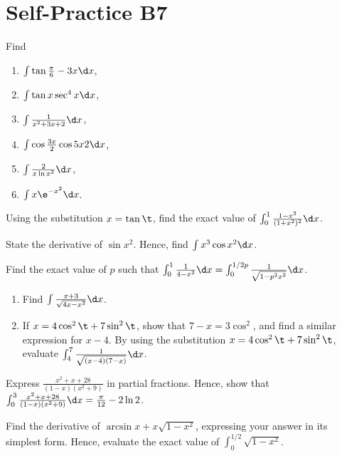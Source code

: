 \section{Self-Practice B7}

\begin{problem}
    Find
    \begin{enumerate}
        \item $\int \tan{\frac\pi6 - 3x} \d x$,
        \item $\int \tan x \sec^4 x \d x$,
        \item $\int \frac1{x^2 + 3x + 2} \d x$,
        \item $\int \cos \frac{3x}{2} \cos{5x}{2} \d x$,
        \item $\int \frac2{x \ln x^2} \d x$,
        \item $\int x \e^{-x^2} \d x$.
    \end{enumerate}
\end{problem}

\begin{problem}
    Using the substitution $x = \tan \t$, find the exact value of $\int_0^1 \frac{1 - x^2}{(1 + x^2)^2} \d x$.
\end{problem}

\begin{problem}
    State the derivative of $\sin x^2$. Hence, find $\int x^3 \cos x^2 \d x$.
\end{problem}

\begin{problem}
    Find the exact value of $p$ such that $\int_0^1 \frac1{4 - x^2} \d x = \int_0^{1/2p} \frac1{\sqrt{1 - p^2 x^2}} \d x$.
\end{problem}

\begin{problem}
    \begin{enumerate}
        \item Find $\int \frac{x + 3}{\sqrt{4x - x^2}} \d x$.
        \item If $x = 4\cos^2 \t + 7\sin^2\t$, show that $7-x = 3\cos^2$, and find a similar expression for $x - 4$. By using the substitution $x = 4\cos^2 \t + 7\sin^2 \t$, evaluate $\int_4^7 \frac1{\sqrt{(x-4)(7-x)}} \d x$.
    \end{enumerate}
\end{problem}

\begin{problem}
    Express $\frac{x^2 + x + 28}{(1-x)(x^2 + 9)}$ in partial fractions. Hence, show that $\int_0^3 \frac{x^2 + x + 28}{(1 - x)(x^2 + 9)} \d x = \frac\pi{12} - 2 \ln 2$.
\end{problem}

\begin{problem}
    Find the derivative of $\arcsin x + x\sqrt{1 - x^2}$, expressing your answer in its simplest form. Hence, evaluate the exact value of $\int_0^{1/2} \sqrt{1 - x^2}$.
\end{problem}